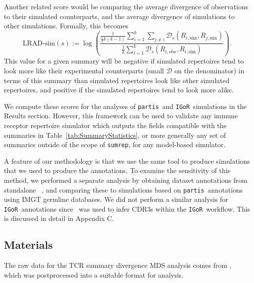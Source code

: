 \documentclass{article}
\newcommand{\partis}{\texttt{partis}}
\newcommand{\igor}{\texttt{IGoR}}
\newcommand{\igblast}{\text{IgBlast}}
\begin{document}
Another related score would be comparing the average divergence of observations to their simulated counterparts, and the average divergence of simulations to other simulations.
Formally, this becomes
\begin{equation}\label{eq:ScoreSim}
    \text{LRAD-sim}(s) :=
    \log \left(
        \frac{
            \frac{1}{\frac{1}{2} k\left(k - 1\right)}
            \sum_{i=1}^{k}
            \sum_{j \ne i}
                \mathcal D_s\left(R_{i, \text{sim}}, R_{j, \text{sim}}\right)
        }
        {
            \frac{1}{k}
            \sum_{i = 1}^k
                \mathcal D_s \left( R_{i, \text{obs}}, R_{i, \text{sim}}\right)
        }
    \right).
\end{equation}
This value for a given summary will be negative if simulated repertoires tend to look more like their experimental counterparts (small $\mathcal D$ on the denominator) in terms of this summary than simulated repertoires look like other simulated repertoires, and positive if the simulated repertoires tend to look more alike.

We compute these scores for the analyses of \partis\ and \igor\ simulations in the Results section.
However, this framework can be used to validate any immune receptor repertoire simulator which outputs the fields compatible with the summaries in Table~\ref{tab:SummaryStatistics}, or more generally any set of summaries outside of the scope of \texttt{sumrep}, for any model-based simulator.

A feature of our methodology is that we use the same tool to produce simulations that we used to produce the annotations.
To examine the sensitivity of this method, we performed a separate analysis by obtaining dataset annotations from standalone \igblast~\cite{Ye2013-kl}, and comparing these to simulations based on \partis\ annotations using IMGT germline databases.
We did not perform a similar analysis for \igor\ annotations since \igblast\ was used to infer CDR3s within the \igor\ workflow.
This is discussed in detail in Appendix C.


\subsection*{Materials}
The raw data for the TCR summary divergence MDS analysis comes from \cite{Pogorelyy2018-ak}, which was postprocessed into a suitable format for analysis.
\end{document}

